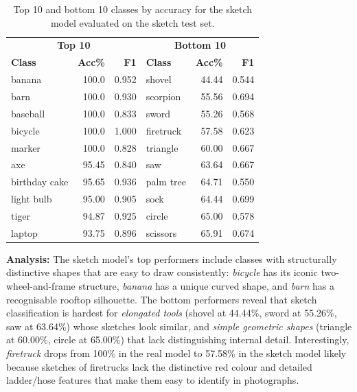 \documentclass[12pt, a4paper]{article}
\begin{document}
\begin{table}[H]
\centering
\caption{Top 10 and bottom 10 classes by accuracy for the sketch model
evaluated on the sketch test set.}
\label{tab:top_bottom_sketch}
\begin{tabular}{lrr|lrr}
\toprule
\multicolumn{3}{c|}{\textbf{Top 10}} & \multicolumn{3}{c}{\textbf{Bottom 10}} \\
\textbf{Class} & \textbf{Acc\%} & \textbf{F1} &
\textbf{Class} & \textbf{Acc\%} & \textbf{F1} \\
\midrule
banana       & 100.0 & 0.952 & shovel     & 44.44 & 0.544 \\
barn         & 100.0 & 0.930 & scorpion   & 55.56 & 0.694 \\
baseball     & 100.0 & 0.833 & sword      & 55.26 & 0.568 \\
bicycle      & 100.0 & 1.000 & firetruck  & 57.58 & 0.623 \\
marker       & 100.0 & 0.828 & triangle   & 60.00 & 0.667 \\
axe          & 95.45 & 0.840 & saw        & 63.64 & 0.667 \\
birthday cake & 95.65 & 0.936 & palm tree  & 64.71 & 0.550 \\
light bulb   & 95.00 & 0.905 & sock       & 64.44 & 0.699 \\
tiger        & 94.87 & 0.925 & circle     & 65.00 & 0.578 \\
laptop       & 93.75 & 0.896 & scissors   & 65.91 & 0.674 \\
\bottomrule
\end{tabular}
\end{table}

\textbf{Analysis:} The sketch model's top performers include classes with
structurally distinctive shapes that are easy to draw consistently:
\emph{bicycle} has its iconic two-wheel-and-frame structure, \emph{banana} has
a unique curved shape, and \emph{barn} has a recognisable rooftop silhouette.
The bottom performers reveal that sketch classification is hardest for
\emph{elongated tools} (shovel at 44.44\%, sword at 55.26\%, saw at 63.64\%)
whose sketches look similar, and \emph{simple geometric shapes} (triangle at
60.00\%, circle at 65.00\%) that lack distinguishing internal detail.
Interestingly, \emph{firetruck} drops from 100\% in the real model to 57.58\%
in the sketch model likely because sketches of firetrucks lack the
distinctive red colour and detailed ladder/hose features that make them easy
to identify in photographs.
\end{document}
